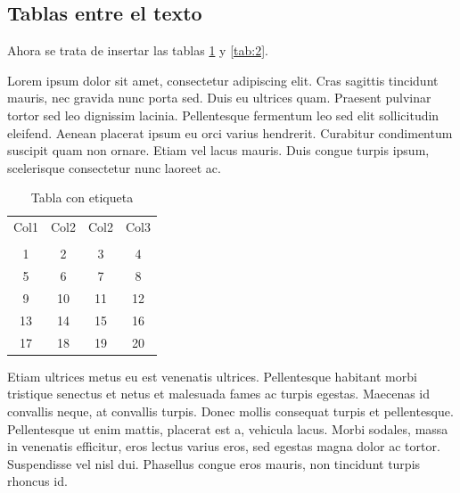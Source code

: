 \documentclass[a4paper,10pt]{article}
\theoremstyle{teorema}
\theoremstyle{plano}
\theoremstyle{titulo}
\begin{document}
\subsection{Tablas entre el texto}

Ahora se trata de insertar las tablas \ref{tab:1} y \ref{tab:2}.

Lorem ipsum dolor sit amet, consectetur adipiscing elit. Cras sagittis tincidunt mauris, nec gravida nunc porta sed. Duis eu ultrices quam. Praesent pulvinar tortor sed leo dignissim lacinia. Pellentesque fermentum leo sed elit sollicitudin eleifend. Aenean placerat ipsum eu orci varius hendrerit. Curabitur condimentum suscipit quam non ornare. Etiam vel lacus mauris. Duis congue turpis ipsum, scelerisque consectetur nunc laoreet ac.

\begin{table}[h]
\centering
\begin{tabular}{||cccc||}
\hline
Col1 & Col2 & Col2 & Col3 \\ & & & \\ \hline\hline
1    & 2    & 3    & 4    \\ \hline
5    & 6    & 7    & 8    \\ \hline
9    & 10   & 11   & 12   \\ \hline
13   & 14   & 15   & 16   \\ \hline
17   & 18   & 19   & 20   \\ \hline
\end{tabular}
\caption{Tabla con etiqueta }
\label{tab:1}
\end{table}

Etiam ultrices metus eu est venenatis ultrices. Pellentesque habitant morbi tristique senectus et netus et malesuada fames ac turpis egestas. Maecenas id convallis neque, at convallis turpis. Donec mollis consequat turpis et pellentesque. Pellentesque ut enim mattis, placerat est a, vehicula lacus. Morbi sodales, massa in venenatis efficitur, eros lectus varius eros, sed egestas magna dolor ac tortor. Suspendisse vel nisl dui. Phasellus congue eros mauris, non tincidunt turpis rhoncus id.
\end{document}
